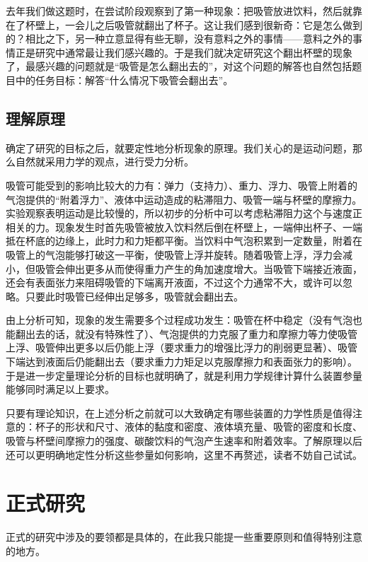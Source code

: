 \documentclass[a4paper,10pt,english]{sphinxmanual}
\begin{document}
去年我们做这题时，在尝试阶段观察到了第一种现象：把吸管放进饮料，然后就靠在了杯壁上，一会儿之后吸管就翻出了杯子。这让我们感到很新奇：它是怎么做到的？相比之下，另一种立意显得有些无聊，没有意料之外的事情——意料之外的事情正是研究中通常最让我们感兴趣的。于是我们就决定研究这个翻出杯壁的现象了，最感兴趣的问题就是“吸管是怎么翻出去的”，对这个问题的解答也自然包括题目中的任务目标：解答“什么情况下吸管会翻出去”。


\subsection{理解原理}
\label{\detokenize{5. Research:id4}}
确定了研究的目标之后，就要定性地分析现象的原理。我们关心的是运动问题，那么自然就采用力学的观点，进行受力分析。

吸管可能受到的影响比较大的力有：弹力（支持力）、重力、浮力、吸管上附着的气泡提供的“附着浮力”、液体中运动造成的粘滞阻力、吸管一端与杯壁的摩擦力。实验观察表明运动是比较慢的，所以初步的分析中可以考虑粘滞阻力这个与速度正相关的力。现象发生时首先吸管被放入饮料然后倒在杯壁上，一端伸出杯子、一端抵在杯底的边缘上，此时力和力矩都平衡。当饮料中气泡积累到一定数量，附着在吸管上的气泡能够打破这一平衡，使吸管上浮并旋转。随着吸管上浮，浮力会减小，但吸管会伸出更多从而使得重力产生的角加速度增大。当吸管下端接近液面，还会有表面张力来阻碍吸管的下端离开液面，不过这个力通常不大，或许可以忽略。只要此时吸管已经伸出足够多，吸管就会翻出去。

由上分析可知，现象的发生需要多个过程成功发生：吸管在杯中稳定（没有气泡也能翻出去的话，就没有特殊性了）、气泡提供的力克服了重力和摩擦力等力使吸管上浮、吸管伸出更多以后仍能上浮（要求重力的增强比浮力的削弱更显著）、吸管下端达到液面后仍能翻出去（要求重力力矩足以克服摩擦力和表面张力的影响）。于是进一步定量理论分析的目标也就明确了，就是利用力学规律计算什么装置参量能够同时满足以上要求。

只要有理论知识，在上述分析之前就可以大致确定有哪些装置的力学性质是值得注意的：杯子的形状和尺寸、液体的黏度和密度、液体填充量、吸管的密度和长度、吸管与杯壁间摩擦力的强度、碳酸饮料的气泡产生速率和附着效率。了解原理以后还可以更明确地定性分析这些参量如何影响，这里不再赘述，读者不妨自己试试。


\section{正式研究}
\label{\detokenize{5. Research:id5}}
正式的研究中涉及的要领都是具体的，在此我只能提一些重要原则和值得特别注意的地方。
\end{document}
